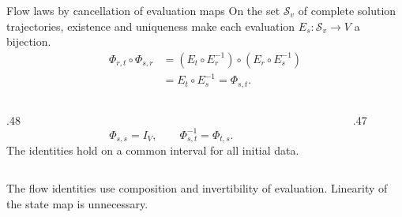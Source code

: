 \begin{frame}[t]{Flow laws by cancellation of evaluation maps}
\hypertarget{main:laws}{}
On the set $\mathcal S_v$ of complete solution trajectories, existence and
uniqueness make each evaluation $E_s:\mathcal S_v\to V$ a bijection.
\begin{equation*}
  \begin{aligned}
    \Phi_{r,t}\circ\Phi_{s,r}
      &=(E_t\circ E_r^{-1})\circ(E_r\circ E_s^{-1})\\
      &=E_t\circ E_s^{-1}=\Phi_{s,t}.
  \end{aligned}
\end{equation*}
\begin{columns}[T,onlytextwidth]
  \begin{column}{.48\textwidth}
    \begin{equation*}
      \Phi_{s,s}=I_V,\qquad \Phi_{s,t}^{-1}=\Phi_{t,s}.
    \end{equation*}
    The identities hold on a common interval for all initial data.
  \end{column}
  \begin{column}{.47\textwidth}
  \end{column}
\end{columns}
\medskip
The flow identities use composition and invertibility of evaluation.
Linearity of the state map is unnecessary.
\end{frame}
